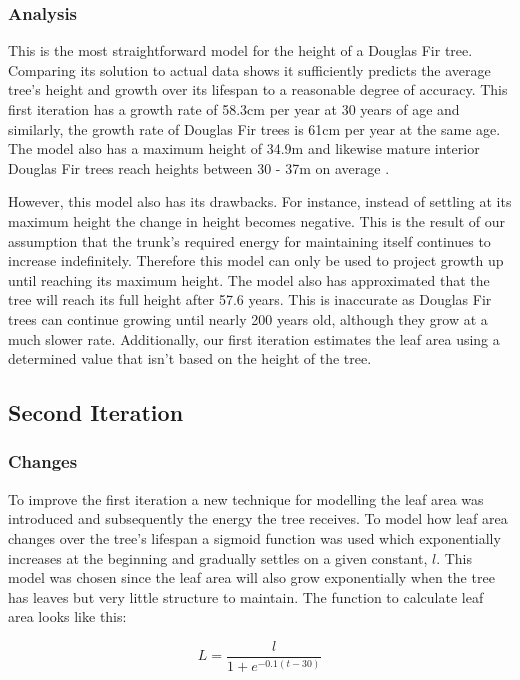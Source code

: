 \documentclass[twocolumn]{article} %
\begin{document}
\subsubsection{Analysis}

This is the most straightforward model for the height of a Douglas Fir tree. Comparing its solution to actual data shows it sufficiently predicts the average tree’s height and growth over its lifespan to a reasonable degree of accuracy. This first iteration has a growth rate of 58.3cm per year at 30 years of age and similarly, the growth rate of Douglas Fir trees is 61cm per year at the same age. The model also has a maximum height of 34.9m and likewise mature interior Douglas Fir trees reach heights between 30 - 37m on average \cite{three}.

However, this model also has its drawbacks. For instance, instead of settling at its maximum height the change in height becomes negative. This is the result of our assumption that the trunk’s required energy for maintaining itself continues to increase indefinitely. Therefore this model can only be used to project growth up until reaching its maximum height. The model also has approximated that the tree will reach its full height after 57.6 years. This is inaccurate as Douglas Fir trees can continue growing until nearly 200 years old, although they grow at a much slower rate. Additionally, our first iteration estimates the leaf area using a determined value that isn’t based on the height of the tree.


\subsection{Second Iteration}
\subsubsection{Changes}

To improve the first iteration a new technique for modelling the leaf area was introduced and subsequently the energy the tree receives. To model how leaf area changes over the tree’s lifespan a sigmoid function was used which exponentially increases at the beginning and gradually settles on a given constant, $l$. This model was chosen since the leaf area will also grow exponentially when the tree has leaves but very little structure to maintain. The function to calculate leaf area looks like this:

\begin{equation}
\label{eq:six}
    L = \frac{l}{1+e^{-0.1(t-30)}}
\end{equation}
\end{document}
